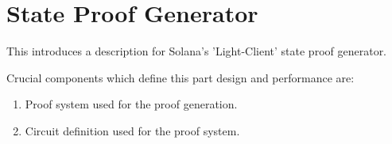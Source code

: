 \chapter{State Proof Generator}

This introduces a description for Solana's 'Light-Client' state proof generator.

Crucial components which define this part design and performance are:
\begin{enumerate}
    \item Proof system used for the proof generation.
    \item Circuit definition used for the proof system.
\end{enumerate}











